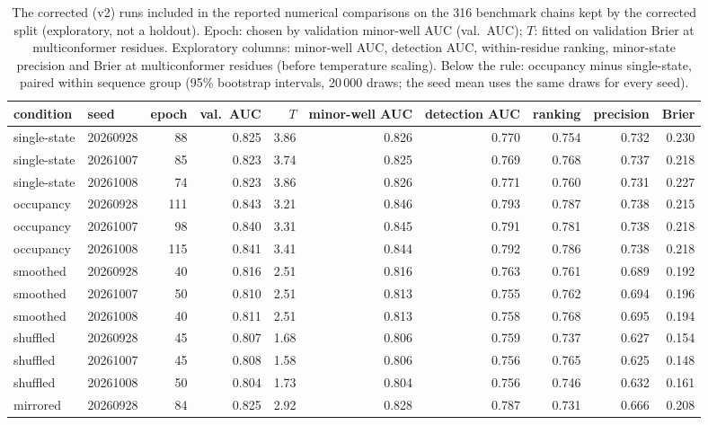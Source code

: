 \documentclass[10pt,a4paper]{article}
\begin{document}
\begin{table}[!htbp]\centering
\caption{The corrected (v2) runs included in the reported numerical comparisons on the 316 benchmark chains kept by the corrected split
(exploratory, not a holdout). Epoch: chosen by validation minor-well AUC (val.\ AUC); $T$:
fitted on validation Brier at multiconformer residues. Exploratory columns: minor-well AUC,
detection AUC, within-residue ranking, minor-state precision and Brier at multiconformer
residues (before temperature scaling). Below the rule: occupancy minus single-state, paired within sequence
group (95\% bootstrap intervals, 20\,000 draws; the seed mean uses the same draws for every seed).}
\label{tab:v2runs}
\footnotesize\setlength{\tabcolsep}{3pt}
\begin{tabular}{@{}llrrrrrrrr@{}}
\toprule
condition & seed & epoch & val.\ AUC & $T$ & minor-well AUC & detection AUC & ranking & precision & Brier \\
\midrule
single-state & 20260928 & 88 & 0.825 & 3.86 & 0.826 & 0.770 & 0.754 & 0.732 & 0.230 \\
single-state & 20261007 & 85 & 0.823 & 3.74 & 0.825 & 0.769 & 0.768 & 0.737 & 0.218 \\
single-state & 20261008 & 74 & 0.823 & 3.86 & 0.826 & 0.771 & 0.760 & 0.731 & 0.227 \\
occupancy & 20260928 & 111 & 0.843 & 3.21 & 0.846 & 0.793 & 0.787 & 0.738 & 0.215 \\
occupancy & 20261007 & 98 & 0.840 & 3.31 & 0.845 & 0.791 & 0.781 & 0.738 & 0.218 \\
occupancy & 20261008 & 115 & 0.841 & 3.41 & 0.844 & 0.792 & 0.786 & 0.738 & 0.218 \\
smoothed & 20260928 & 40 & 0.816 & 2.51 & 0.816 & 0.763 & 0.761 & 0.689 & 0.192 \\
smoothed & 20261007 & 50 & 0.810 & 2.51 & 0.813 & 0.755 & 0.762 & 0.694 & 0.196 \\
smoothed & 20261008 & 40 & 0.811 & 2.51 & 0.813 & 0.758 & 0.768 & 0.695 & 0.194 \\
shuffled & 20260928 & 45 & 0.807 & 1.68 & 0.806 & 0.759 & 0.737 & 0.627 & 0.154 \\
shuffled & 20261007 & 45 & 0.808 & 1.58 & 0.806 & 0.756 & 0.765 & 0.625 & 0.148 \\
shuffled & 20261008 & 50 & 0.804 & 1.73 & 0.804 & 0.756 & 0.746 & 0.632 & 0.161 \\
mirrored & 20260928 & 84 & 0.825 & 2.92 & 0.828 & 0.787 & 0.731 & 0.666 & 0.208 \\

\end{tabular}
\end{table}
\end{document}
